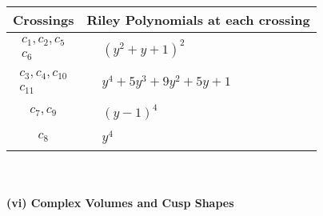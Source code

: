 \documentclass[1p]{elsarticle_modified}
\theoremstyle{definition}
\begin{document}
\begin{tabular}{m{50pt}|m{274pt}}
Crossings & \hspace{64pt}Riley Polynomials at each crossing \\
\hline $$\begin{aligned}c_{1},c_{2},c_{5}\\c_{6}\end{aligned}$$&$\begin{aligned}
&(y^2+y+1)^2
\end{aligned}$\\
\hline $$\begin{aligned}c_{3},c_{4},c_{10}\\c_{11}\end{aligned}$$&$\begin{aligned}
&y^4+5 y^3+9 y^2+5 y+1
\end{aligned}$\\
\hline $$\begin{aligned}c_{7},c_{9}\end{aligned}$$&$\begin{aligned}
&(y-1)^4
\end{aligned}$\\
\hline $$\begin{aligned}c_{8}\end{aligned}$$&$\begin{aligned}
&y^4
\end{aligned}$\\
\hline
\end{tabular}\\~\\
\newpage\flushleft \textbf{(vi) Complex Volumes and Cusp Shapes}
\end{document}
